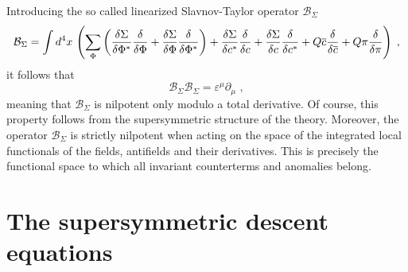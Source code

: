 \documentclass[a4paper,12pt]{article}
\begin{document}
Introducing the so called linearized Slavnov-Taylor operator $\mathcal{B}%
_{\Sigma }$ 
\begin{equation}
\mathcal{B}_{\Sigma }=\int d^{4}x\,\left( \sum_{\Phi }\left( \frac{\delta
\Sigma }{\delta \Phi ^{*}}\frac{\delta }{\delta \Phi }+\frac{\delta \Sigma }{%
\delta \Phi }\frac{\delta }{\delta \Phi ^{*}}\right) +\frac{\delta \Sigma }{%
\delta c^{*}}\frac{\delta }{\delta c}+\frac{\delta \Sigma }{\delta c}\frac{%
\delta }{\delta c^{*}}+Q\overline{c}\frac{\delta }{\delta \overline{c}}+Q\pi 
\frac{\delta }{\delta \pi }\right) \;,  \label{sto}
\end{equation}
it follows that 
\begin{equation}
\mathcal{B}_{\Sigma }\mathcal{B}_{\Sigma }=\varepsilon ^{\mu }\partial _{\mu
}\,\,,  \label{stonil}
\end{equation}
meaning that $\mathcal{B}_{\Sigma }$ is nilpotent only modulo a total
derivative. Of course, this property follows from the supersymmetric
structure of the theory. Moreover, the operator $\mathcal{B}_{\Sigma }$ is
strictly nilpotent when acting on the space of the integrated local
functionals of the fields, antifields and their derivatives. This is
precisely the functional space to which all invariant counterterms and
anomalies belong.

\section{The supersymmetric descent equations}
\end{document}
